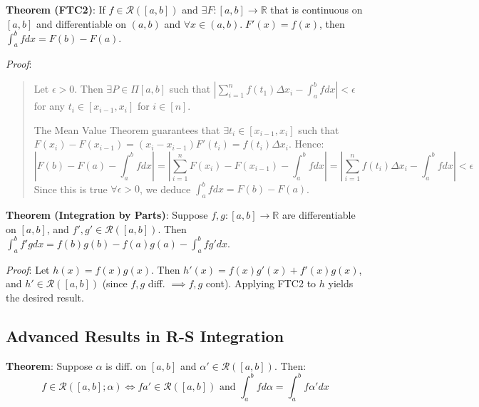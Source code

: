 \documentclass[11pt]{article}
\begin{document}
\textbf{Theorem (FTC2)}: If $f \in \mathcal{R}([a,b])$ and $\exists F : [a,b] \to \mathbb{R}$ that is continuous on $[a,b]$ and differentiable on $(a,b)$ and $\forall x \in (a,b).\; F'(x) = f(x)$, then $\int_a^b f dx = F(b) - F(a)$.

\emph{Proof}:
\begin{quote}\vspace{-0.3cm}
Let $\epsilon > 0$. Then $\exists P \in \Pi[a,b]$ such that $|\sum_{i=1}^n f(t_1) \Delta x_i - \int_a^b f dx| < \epsilon$ for any $t_i \in [x_{i-1}, x_i]$ for $i \in [n]$.

The Mean Value Theorem guarantees that $\exists t_i \in [x_{i-1}, x_i]$ such that $F(x_i) - F(x_{i-1}) = (x_i - x_{i-1}) F'(t_i) = f(t_i) \Delta x_i$. Hence:
\begin{displaymath}
\left|F(b) - F(a) - \int_a^b f dx\right| = \left|\sum_{i=1}^n F(x_i) - F(x_{i-1}) - \int_a^b f dx\right| = \left|\sum_{i=1}^n f(t_i) \Delta x_i - \int_a^b f dx\right| < \epsilon
\end{displaymath}
Since this is true $\forall \epsilon > 0$, we deduce $\int_a^b f dx = F(b) - F(a)$.
\end{quote}

\textbf{Theorem (Integration by Parts)}: Suppose $f, g : [a,b] \to \mathbb{R}$ are differentiable on $[a,b]$, and $f', g' \in \mathcal{R}([a,b])$. Then $\int_a^b f'g dx = f(b)g(b) - f(a)g(a) - \int_a^b fg' dx$.

\emph{Proof}: Let $h(x) = f(x)g(x)$. Then $h'(x) = f(x)g'(x) + f'(x)g(x)$, and $h' \in \mathcal{R}([a,b])$ (since $f,g$ diff. $\implies f,g$ cont). Applying FTC2 to $h$ yields the desired result.

\subsection{Advanced Results in R-S Integration}

\textbf{Theorem}: Suppose $\alpha$ is diff. on $[a,b]$ and $\alpha' \in \mathcal{R}([a,b])$. Then:
\begin{displaymath}
f \in \mathcal{R}([a,b]; \alpha) \iff fa' \in \mathcal{R}([a,b]) \text{ and } \int_a^b f d\alpha = \int_a^b f \alpha' dx
\end{displaymath}
\end{document}
